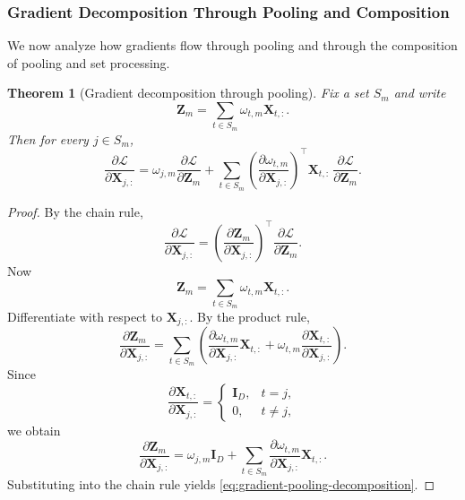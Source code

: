 \documentclass{article}
\theoremstyle{plain}
\newtheorem{theorem}{Theorem}[section]
\theoremstyle{definition}
\theoremstyle{remark}
\begin{document}
\subsubsection{Gradient Decomposition Through Pooling and Composition}
\label{sec:tier-a-gradients}

We now analyze how gradients flow through pooling and through the composition of pooling and set processing.

\begin{theorem}[Gradient decomposition through pooling]
\label{thm:gradient-decomposition-pooling}
Fix a set $S_m$ and write
\[
\mathbf{Z}_m
=
\sum_{t\in S_m}\omega_{t,m}\mathbf{X}_{t,:}.
\]
Then for every $j\in S_m$,
\begin{equation}
\label{eq:gradient-pooling-decomposition}
\frac{\partial \mathcal{L}}{\partial \mathbf{X}_{j,:}}
=
\omega_{j,m}\frac{\partial \mathcal{L}}{\partial \mathbf{Z}_m}
+
\sum_{t\in S_m}
\left(
\frac{\partial \omega_{t,m}}{\partial \mathbf{X}_{j,:}}
\right)^{\!\top}
\!\!\mathbf{X}_{t,:}\,
\frac{\partial \mathcal{L}}{\partial \mathbf{Z}_m}.
\end{equation}
\end{theorem}

\begin{proof}
By the chain rule,
\[
\frac{\partial \mathcal{L}}{\partial \mathbf{X}_{j,:}}
=
\left(
\frac{\partial \mathbf{Z}_m}{\partial \mathbf{X}_{j,:}}
\right)^{\!\top}
\frac{\partial \mathcal{L}}{\partial \mathbf{Z}_m}.
\]
Now
\[
\mathbf{Z}_m = \sum_{t\in S_m} \omega_{t,m}\mathbf{X}_{t,:}.
\]
Differentiate with respect to $\mathbf{X}_{j,:}$. By the product rule,
\[
\frac{\partial \mathbf{Z}_m}{\partial \mathbf{X}_{j,:}}
=
\sum_{t\in S_m}
\left(
\frac{\partial \omega_{t,m}}{\partial \mathbf{X}_{j,:}}\mathbf{X}_{t,:}
+
\omega_{t,m}\frac{\partial \mathbf{X}_{t,:}}{\partial \mathbf{X}_{j,:}}
\right).
\]
Since
\[
\frac{\partial \mathbf{X}_{t,:}}{\partial \mathbf{X}_{j,:}}
=
\begin{cases}
\mathbf{I}_D, & t=j,\\
0, & t\neq j,
\end{cases}
\]
we obtain
\[
\frac{\partial \mathbf{Z}_m}{\partial \mathbf{X}_{j,:}}
=
\omega_{j,m}\mathbf{I}_D
+
\sum_{t\in S_m}
\frac{\partial \omega_{t,m}}{\partial \mathbf{X}_{j,:}}\mathbf{X}_{t,:}.
\]
Substituting into the chain rule yields \eqref{eq:gradient-pooling-decomposition}.
\end{proof}
\end{document}
